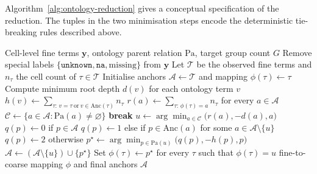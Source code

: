 \documentclass[pdflatex,sn-nature]{sn-jnl}%
\theoremstyle{thmstyleone}%
\theoremstyle{thmstyletwo}%
\theoremstyle{thmstylethree}%
\begin{document}
Algorithm~\ref{alg:ontology-reduction} gives a conceptual specification of the reduction.
The tuples in the two minimisation steps encode the deterministic tie-breaking rules described above.

\begin{algorithm}[t]
\caption{Frequency-adaptive reduction of fine Cell Ontology terms}
\label{alg:ontology-reduction}
\begin{algorithmic}[1]
\Require Cell-level fine terms \(\mathbf{y}\), ontology parent relation \(\mathrm{Pa}\), target group count \(G\)
\State Remove special labels \(\{\texttt{unknown},\texttt{na},\mathrm{missing}\}\) from \(\mathbf{y}\)
\State Let \(\mathcal{T}\) be the observed fine terms and \(n_\tau\) the cell count of \(\tau\in\mathcal{T}\)
\State Initialise anchors \(\mathcal{A}\gets\mathcal{T}\) and mapping \(\phi(\tau)\gets \tau\)
\State Compute minimum root depth \(d(v)\) for each ontology term \(v\)
\State \(h(v)\gets\sum_{\tau:\,v=\tau\ \mathrm{or}\ v\in\mathrm{Anc}(\tau)} n_\tau\)
    \State \(r(a)\gets\sum_{\tau:\,\phi(\tau)=a}n_\tau\) for every \(a\in\mathcal{A}\)
    \State \(\mathcal{C}\gets\{a\in\mathcal{A}:\mathrm{Pa}(a)\neq\varnothing\}\)
        \State \textbf{break}
    \EndIf
    \State \(u\gets\arg\min_{a\in\mathcal{C}}\bigl(r(a),-d(a),a\bigr)\)
        \State \(q(p)\gets 0\) if \(p\in\mathcal{A}\)
        \State \(q(p)\gets 1\) else if \(p\in\mathrm{Anc}(a)\) for some \(a\in\mathcal{A}\setminus\{u\}\)
        \State \(q(p)\gets 2\) otherwise
    \EndFor
    \State \(p^\star\gets\arg\min_{p\in\mathrm{Pa}(u)}\bigl(q(p),-h(p),p\bigr)\)
    \State \(\mathcal{A}\gets(\mathcal{A}\setminus\{u\})\cup\{p^\star\}\)
    \State Set \(\phi(\tau)\gets p^\star\) for every \(\tau\) such that \(\phi(\tau)=u\)
\EndWhile
\State \Return fine-to-coarse mapping \(\phi\) and final anchors \(\mathcal{A}\)
\end{algorithmic}
\end{algorithm}
\end{document}
